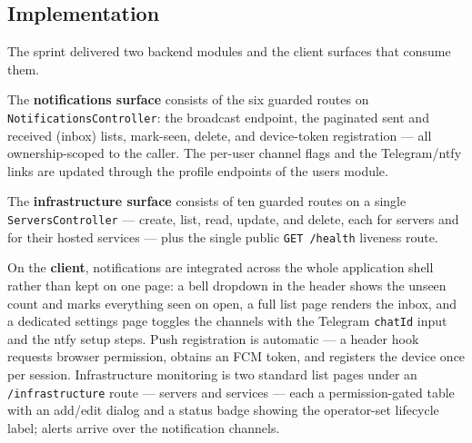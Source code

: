 
\subsection{Implementation}

The sprint delivered two backend modules and the client surfaces that consume them.

The \textbf{notifications surface} consists of the six guarded routes on
\texttt{NotificationsController}: the broadcast endpoint, the paginated sent and received
(inbox) lists, mark-seen, delete, and device-token registration --- all ownership-scoped to
the caller. The per-user channel flags and the Telegram/ntfy links are updated through the
profile endpoints of the users module.

The \textbf{infrastructure surface} consists of ten guarded routes on a single
\texttt{ServersController} --- create, list, read, update, and delete, each for servers and
for their hosted services --- plus the single public \texttt{GET /health} liveness route.

On the \textbf{client}, notifications are integrated across the whole application shell rather
than kept on one page: a bell dropdown in the header shows the unseen count and marks everything
seen on open, a full list page renders the inbox, and a dedicated settings page toggles the
channels with the Telegram \texttt{chatId} input and the ntfy setup steps. Push registration is
automatic --- a header hook requests browser permission, obtains an FCM token, and registers
the device once per session. Infrastructure monitoring is two standard list pages under an
\texttt{/infrastructure} route --- servers and services --- each a permission-gated table with
an add/edit dialog and a status badge showing the operator-set lifecycle label; alerts arrive
over the notification channels.






